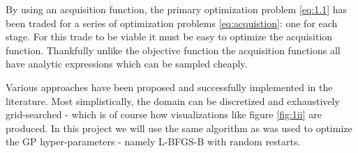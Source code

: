 By using an acquisition function, the primary optimization problem \ref{eq:1.1} has been traded for a series of optimization problems \ref{eq:acquistion}: one for each stage. For this trade to be viable it must be easy to optimize the acquisition function. Thankfully unlike the objective function the acquisition functions all have analytic expressions which can be sampled cheaply.

Various approaches have been proposed and successfully implemented in the literature. Most simplistically, the domain can be discretized and exhaustively grid-searched - which is of course how visualizations like figure \ref{fig:1ii} are produced. In this project we will use the same algorithm as was used to optimize the GP hyper-parameters - namely L-BFGS-B with random restarts.